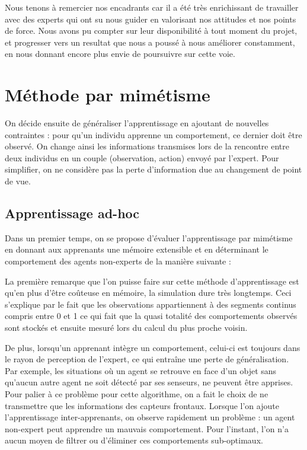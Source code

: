 \documentclass[a4paper, 12pt]{report}
\begin{document}
    
    Nous tenons à remercier nos encadrants car il a été très enrichissant de travailler avec des experts qui ont su nous guider en valorisant nos attitudes et nos points de force. Nous avons pu compter sur leur disponibilité à tout moment du projet, et progresser vers un resultat que nous a poussé à nous améliorer constamment, en nous donnant encore plus envie de poursuivre sur cette voie.  
    
    
	\section{Méthode par mimétisme}
	On décide ensuite de généraliser l'apprentissage en ajoutant de nouvelles contraintes : pour qu'un individu apprenne un comportement, ce dernier doit être observé. On change ainsi les informations transmises lors de la rencontre entre deux individus en un couple (observation, action) envoyé par l'expert.
	Pour simplifier, on ne considère pas la perte d'information due au changement de point de vue.
	\subsection{Apprentissage ad-hoc}
	Dans un premier temps, on se propose d'évaluer l'apprentissage par mimétisme en donnant aux apprenants une mémoire extensible et en déterminant le comportement des agents non-experts de la manière suivante :

	
	La première remarque que l'on puisse faire sur cette méthode d'apprentissage est qu'en plus d'être coûteuse en mémoire, la simulation dure très longtemps. Ceci s'explique par le fait que les observations appartiennent à des segments continus compris entre 0 et 1 ce qui fait que la quasi totalité des comportements observés sont stockés et ensuite mesuré lors du calcul du plus proche voisin.
	
	De plus, lorsqu'un apprenant intègre un comportement, celui-ci est toujours dans le rayon de perception de l'expert, ce qui entraîne une perte de généralisation. Par exemple, les situations où un agent se retrouve en face d'un objet sans qu'aucun autre agent ne soit détecté par ses senseurs, ne peuvent être apprises.
	Pour palier à ce problème pour cette algorithme, on a fait le choix de ne transmettre que les informations des capteurs frontaux.
	Lorsque l'on ajoute l'apprentissage inter-apprenants, on observe rapidement un problème : un agent non-expert peut apprendre un mauvais comportement. Pour l'instant, l'on n'a aucun moyen de filtrer ou d'éliminer ces comportements sub-optimaux.
	
\end{document}
